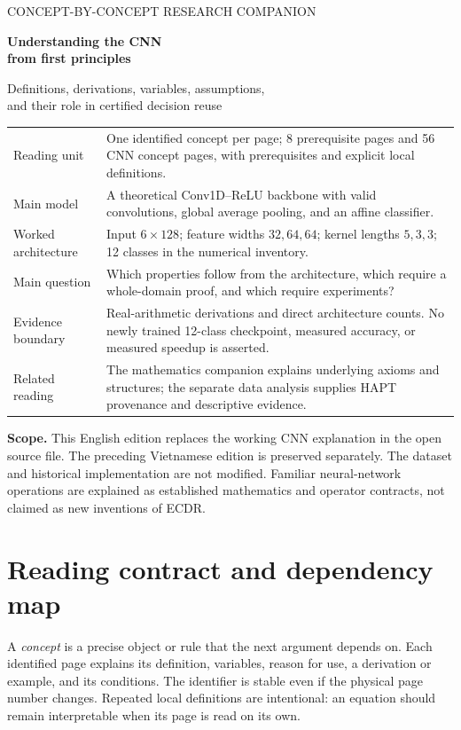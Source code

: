 \documentclass[11pt,a4paper]{article}
\begin{document}
\hypersetup{pageanchor=false}
\begin{titlepage}
\vspace*{1.1cm}
{\Large\color{teal} CONCEPT-BY-CONCEPT RESEARCH COMPANION\par}
\vspace{0.7cm}
{\huge\bfseries\color{ink} Understanding the CNN\\[0.2cm]from first principles\par}
\vspace{0.7cm}
{\Large Definitions, derivations, variables, assumptions,\\and their role in certified decision reuse\par}
\vspace{1cm}
\begin{tabularx}{\linewidth}{@{}P{3.2cm}Y@{}}\toprule
Reading unit & One identified concept per page; 8 prerequisite pages and 56 CNN concept pages, with prerequisites and explicit local definitions.\\
Main model & A theoretical Conv1D--ReLU backbone with valid convolutions, global average pooling, and an affine classifier.\\
Worked architecture & Input $6\times128$; feature widths $32,64,64$; kernel lengths $5,3,3$; 12 classes in the numerical inventory.\\
Main question & Which properties follow from the architecture, which require a whole-domain proof, and which require experiments?\\
Evidence boundary & Real-arithmetic derivations and direct architecture counts. No newly trained 12-class checkpoint, measured accuracy, or measured speedup is asserted.\\
Related reading & The mathematics companion explains underlying axioms and structures; the separate data analysis supplies HAPT provenance and descriptive evidence.\\\bottomrule
\end{tabularx}
\vfill
\textbf{Scope.} This English edition replaces the working CNN explanation in the open source file. The preceding Vietnamese edition is preserved separately. The dataset and historical implementation are not modified. Familiar neural-network operations are explained as established mathematics and operator contracts, not claimed as new inventions of ECDR.
\end{titlepage}
\hypersetup{pageanchor=true}
\section*{Reading contract and dependency map}
A \emph{concept} is a precise object or rule that the next argument depends on. Each identified page explains its definition, variables, reason for use, a derivation or example, and its conditions. The identifier is stable even if the physical page number changes. Repeated local definitions are intentional: an equation should remain interpretable when its page is read on its own.
\end{document}
